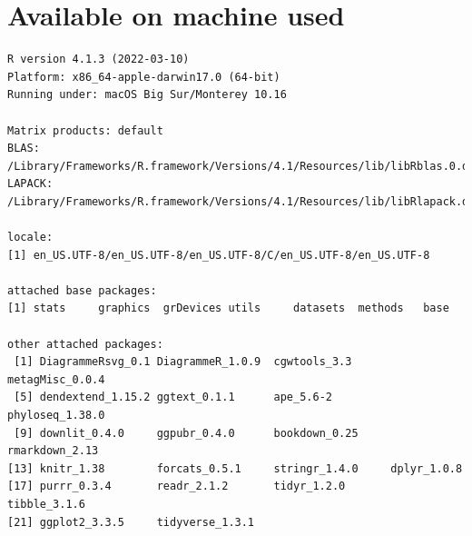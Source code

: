\documentclass[
  12pt,
  openany]{book}
\begin{document}
\hypertarget{available-on-machine-used}{%
\section{Available on machine used}\label{available-on-machine-used}}

\begin{verbatim}
R version 4.1.3 (2022-03-10)
Platform: x86_64-apple-darwin17.0 (64-bit)
Running under: macOS Big Sur/Monterey 10.16

Matrix products: default
BLAS:   /Library/Frameworks/R.framework/Versions/4.1/Resources/lib/libRblas.0.dylib
LAPACK: /Library/Frameworks/R.framework/Versions/4.1/Resources/lib/libRlapack.dylib

locale:
[1] en_US.UTF-8/en_US.UTF-8/en_US.UTF-8/C/en_US.UTF-8/en_US.UTF-8

attached base packages:
[1] stats     graphics  grDevices utils     datasets  methods   base     

other attached packages:
 [1] DiagrammeRsvg_0.1 DiagrammeR_1.0.9  cgwtools_3.3      metagMisc_0.0.4  
 [5] dendextend_1.15.2 ggtext_0.1.1      ape_5.6-2         phyloseq_1.38.0  
 [9] downlit_0.4.0     ggpubr_0.4.0      bookdown_0.25     rmarkdown_2.13   
[13] knitr_1.38        forcats_0.5.1     stringr_1.4.0     dplyr_1.0.8      
[17] purrr_0.3.4       readr_2.1.2       tidyr_1.2.0       tibble_3.1.6     
[21] ggplot2_3.3.5     tidyverse_1.3.1  


\end{verbatim}
\end{document}
